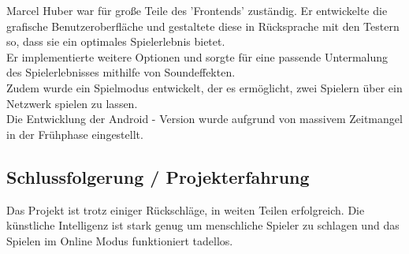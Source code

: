 \documentclass[12pt,a4paper]{article}
\begin{document}
	Marcel Huber war für große Teile des 'Frontends' zuständig. Er entwickelte die grafische Benutzeroberfläche und gestaltete diese in Rücksprache mit den Testern so, dass sie ein optimales Spielerlebnis bietet. \\[2ex]
Er implementierte weitere Optionen und sorgte für eine passende Untermalung des Spielerlebnisses mithilfe von Soundeffekten.\\
Zudem wurde ein Spielmodus entwickelt, der es ermöglicht, zwei Spielern über ein Netzwerk spielen zu lassen. \\
Die Entwicklung der Android - Version wurde aufgrund von massivem Zeitmangel in der Frühphase eingestellt. 

\newpage
 \subsection{Schlussfolgerung / Projekterfahrung}
 
 Das Projekt ist trotz einiger Rückschläge, in weiten Teilen erfolgreich. Die künstliche Intelligenz ist stark genug um menschliche Spieler zu schlagen und das Spielen im Online Modus funktioniert tadellos. \\
 
\end{document}
